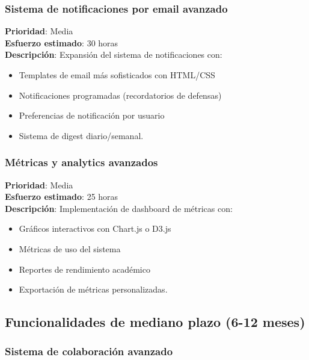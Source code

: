 \documentclass[12pt,a4paper,oneside]{report}
\providecommand{\tightlist}{%
  \setlength{\itemsep}{0pt}\setlength{\parskip}{0pt}}
\begin{document}
{\subsubsection{Sistema de notificaciones por email
avanzado}\label{sistema-de-notificaciones-por-email-avanzado}

\textbf{Prioridad}: Media\\
\textbf{Esfuerzo estimado}: 30 horas\\
\textbf{Descripción}: Expansión del sistema de notificaciones con:

\begin{itemize}
\tightlist
\item
  Templates de email más sofisticados con HTML/CSS
\item
  Notificaciones programadas (recordatorios de defensas)
\item
  Preferencias de notificación por usuario
\item
  Sistema de digest diario/semanal.
\end{itemize}

\subsubsection{Métricas y analytics
avanzados}\label{muxe9tricas-y-analytics-avanzados}

\textbf{Prioridad}: Media\\
\textbf{Esfuerzo estimado}: 25 horas\\
\textbf{Descripción}: Implementación de dashboard de métricas con:

\begin{itemize}
\tightlist
\item
  Gráficos interactivos con Chart.js o D3.js
\item
  Métricas de uso del sistema
\item
  Reportes de rendimiento académico
\item
  Exportación de métricas personalizadas.
\end{itemize}

\subsection{Funcionalidades de mediano plazo (6-12
meses)}\label{funcionalidades-de-mediano-plazo-6-12-meses}

\subsubsection{Sistema de colaboración
avanzado}\label{sistema-de-colaboraciuxf3n-avanzado}

}
\end{document}
